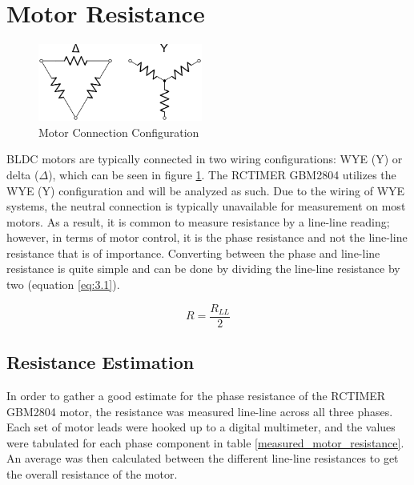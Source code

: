 
\section{Motor Resistance}

\begin{figure}[H]%
	\begin{center}
		\includegraphics[height=1in]{figures/motor_winding.png}
		
		\caption[Motor Connection Configuration]{Motor Connection Configuration}
		
		\label{motor_configuration}
	\end{center}
\end{figure}

BLDC motors are typically connected in two wiring configurations: WYE (Y) or delta (\(\Delta \)), which can be seen in figure \ref{motor_configuration}. The RCTIMER GBM2804 utilizes the WYE (Y) configuration and will be analyzed as such. Due to the wiring of WYE systems, the neutral connection is typically unavailable for measurement on most motors. As a result, it is common to measure resistance by a line-line reading; however, in terms of motor control, it is the phase resistance and not the line-line resistance that is of importance. Converting between the phase and line-line resistance is quite simple and can be done by dividing the line-line resistance by two (equation \ref{eq:3.1}).

\begin{equation} \label{eq:3.1}
R = \frac{R_{LL}}{2}
\end{equation}

\subsection{Resistance Estimation}

In order to gather a good estimate for the phase resistance of the RCTIMER GBM2804 motor, the resistance was measured line-line across all three phases. Each set of motor leads were hooked up to a digital multimeter, and the values were tabulated for each phase component in table \ref{measured_motor_resistance}. An average was then calculated between the different line-line resistances to get the overall resistance of the motor.

